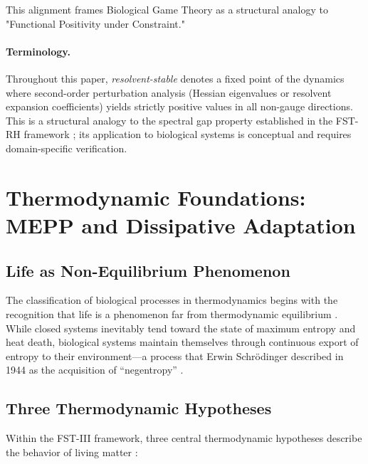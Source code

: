 \documentclass[12pt,a4paper]{article}
\theoremstyle{remark}
\begin{document}
This alignment frames Biological Game Theory as a structural analogy to "Functional Positivity under Constraint."

\paragraph{Terminology.} Throughout this paper, \emph{resolvent-stable} denotes a fixed point of the dynamics where second-order perturbation analysis (Hessian eigenvalues or resolvent expansion coefficients) yields strictly positive values in all non-gauge directions. This is a structural analogy to the spectral gap property established in the FST-RH framework \citep{FST-RH2}; its application to biological systems is conceptual and requires domain-specific verification.

\section{Thermodynamic Foundations: MEPP and Dissipative Adaptation}
\label{sec:thermodynamics}

\subsection{Life as Non-Equilibrium Phenomenon}

The classification of biological processes in thermodynamics begins with the recognition that life is a phenomenon far from thermodynamic equilibrium \citep{EcosystemMEPP}. While closed systems inevitably tend toward the state of maximum entropy and heat death, biological systems maintain themselves through continuous export of entropy to their environment---a process that Erwin Schr\"odinger described in 1944 as the acquisition of ``negentropy'' \citep{EcosystemMEPP}.

\subsection{Three Thermodynamic Hypotheses}

Within the FST-III framework, three central thermodynamic hypotheses describe the behavior of living matter \citep{EcosystemMEPP}:
\end{document}
